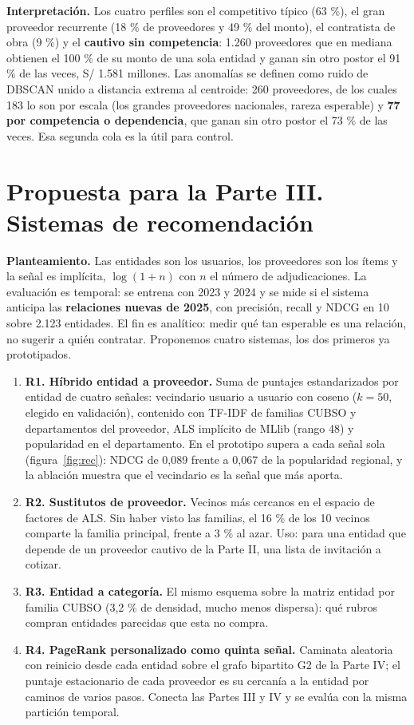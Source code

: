 \documentclass[10pt,a4paper]{article}
\begin{document}
\textbf{Interpretación.} Los cuatro perfiles son el competitivo típico (63 \%), el gran proveedor recurrente (18 \% de proveedores y 49 \% del monto), el contratista de obra (9 \%) y el \textbf{cautivo sin competencia}: 1.260 proveedores que en mediana obtienen el 100 \% de su monto de una sola entidad y ganan sin otro postor el 91 \% de las veces, S/ 1.581 millones. Las anomalías se definen como ruido de DBSCAN unido a distancia extrema al centroide: 260 proveedores, de los cuales 183 lo son por escala (los grandes proveedores nacionales, rareza esperable) y \textbf{77 por competencia o dependencia}, que ganan sin otro postor el 73 \% de las veces. Esa segunda cola es la útil para control.

\clearpage
\section*{Propuesta para la Parte III. Sistemas de recomendación}

\textbf{Planteamiento.} Las entidades son los usuarios, los proveedores son los ítems y la señal es implícita, $\log(1+n)$ con $n$ el número de adjudicaciones. La evaluación es temporal: se entrena con 2023 y 2024 y se mide si el sistema anticipa las \textbf{relaciones nuevas de 2025}, con precisión, recall y NDCG en 10 sobre 2.123 entidades. El fin es analítico: medir qué tan esperable es una relación, no sugerir a quién contratar. Proponemos cuatro sistemas, los dos primeros ya prototipados.

\begin{enumerate}
\item \textbf{R1. Híbrido entidad a proveedor.} Suma de puntajes estandarizados por entidad de cuatro señales: vecindario usuario a usuario con coseno ($k=50$, elegido en validación), contenido con TF-IDF de familias CUBSO y departamentos del proveedor, ALS implícito de MLlib (rango 48) y popularidad en el departamento. En el prototipo supera a cada señal sola (figura~\ref{fig:rec}): NDCG de 0,089 frente a 0,067 de la popularidad regional, y la ablación muestra que el vecindario es la señal que más aporta.
\item \textbf{R2. Sustitutos de proveedor.} Vecinos más cercanos en el espacio de factores de ALS. Sin haber visto las familias, el 16 \% de los 10 vecinos comparte la familia principal, frente a 3 \% al azar. Uso: para una entidad que depende de un proveedor cautivo de la Parte II, una lista de invitación a cotizar.
\item \textbf{R3. Entidad a categoría.} El mismo esquema sobre la matriz entidad por familia CUBSO (3,2 \% de densidad, mucho menos dispersa): qué rubros compran entidades parecidas que esta no compra.
\item \textbf{R4. PageRank personalizado como quinta señal.} Caminata aleatoria con reinicio desde cada entidad sobre el grafo bipartito G2 de la Parte IV; el puntaje estacionario de cada proveedor es su cercanía a la entidad por caminos de varios pasos. Conecta las Partes III y IV y se evalúa con la misma partición temporal.
\end{enumerate}
\end{document}
